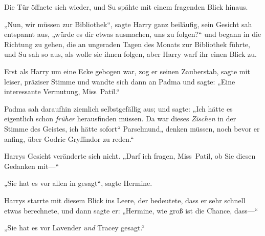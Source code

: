 Die Tür öffnete sich wieder, und Su spähte mit einem fragenden Blick hinaus.

„Nun, wir müssen zur Bibliothek“, sagte Harry ganz beiläufig, sein Gesicht sah entspannt aus, „würde es dir etwas ausmachen, uns zu folgen?“ und begann in die Richtung zu gehen, die an ungeraden Tagen des Monats zur Bibliothek führte, und Su sah so aus, als wolle sie ihnen folgen, aber Harry warf ihr einen Blick zu.

Erst als Harry um eine Ecke gebogen war, zog er seinen Zauberstab, sagte mit leiser, präziser Stimme  und wandte sich dann an Padma und sagte: „Eine interessante Vermutung, Miss~Patil.“

Padma sah daraufhin ziemlich selbstgefällig aus; und sagte: „Ich hätte es eigentlich schon \emph{früher} herausfinden müssen. Da war dieses \emph{Zischen} in der Stimme des Geistes, ich hätte sofort“ Parselmund„ denken müssen, noch bevor er anfing, über Godric Gryffindor zu reden.“

Harrys Gesicht veränderte sich nicht. „Darf ich fragen, Miss~Patil, ob Sie diesen Gedanken mit—“

„Sie hat es vor allen in \SPHEW gesagt“, sagte Hermine.

Harrys starrte mit diesem Blick ins Leere, der bedeutete, dass er sehr schnell etwas berechnete, und dann sagte er: „Hermine, wie groß ist die Chance, dass—“

„Sie hat es vor Lavender \emph{und} Tracey gesagt.“

